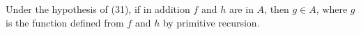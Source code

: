 Under the hypothesis of (31), if in addition $f$ and $h$ are in $A$, then $g \in A$, where $g$ is the function defined from $f$ and $h$ by primitive recursion.
